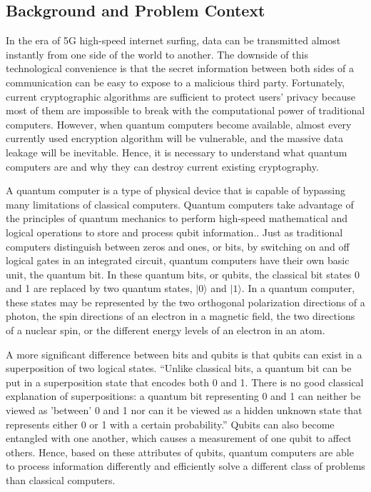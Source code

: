 \documentclass[sigconf]{acmart}
\begin{document}
\subsection{Background and Problem Context}
In the era of 5G high-speed internet surfing, data can be transmitted almost instantly from one side of the world to another. The downside of this technological convenience is that the secret information between both sides of a communication can be easy to expose to a malicious third party. Fortunately, current cryptographic algorithms are sufficient to protect users’ privacy because most of them are impossible to break with the computational power of traditional computers. However, when quantum computers become available, almost every currently used encryption algorithm will be vulnerable, and the massive data leakage will be inevitable. Hence, it is necessary to understand what quantum computers are and why they can destroy current existing cryptography.

A quantum computer is a type of physical device that is capable of bypassing many limitations of classical computers. Quantum computers take advantage of the principles of quantum mechanics to perform  high-speed mathematical and logical operations to store and process qubit information.\cite{shi_superconducting_2015}. Just as traditional computers distinguish between zeros and ones, or bits, by switching on and off logical gates in an integrated circuit, quantum computers have their own basic unit, the quantum bit. In these quantum bits, or qubits, the classical bit states 0 and 1 are replaced by two quantum states, $\rvert 0\rangle$ and $\rvert 1\rangle$. In a quantum computer, these states may be represented by the two orthogonal polarization directions of a photon, the spin directions of an electron in a magnetic field, the two directions of a nuclear spin, or the different energy levels of an electron in an atom.

A more significant difference between bits and qubits is that qubits can exist in a superposition of two logical states. “Unlike classical bits, a quantum bit can be put in a superposition state that encodes both 0 and 1. There is no good classical explanation of superpositions: a quantum bit representing 0 and 1 can neither be viewed as 'between' 0 and 1 nor can it be viewed as a hidden unknown state that represents either 0 or 1 with a certain probability.”\cite{rieffel_introduction_1998} Qubits can also become entangled with one another, which causes a measurement of one qubit to affect others. Hence, based on these attributes of qubits, quantum computers are able to process information differently and efficiently solve a different class of problems than classical computers.
\end{document}

